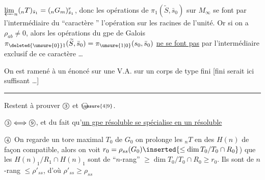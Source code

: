 $\varprojlim_n({}_nT)_{\bar s_1}=({}_nG_m)^r_{\bar s_1}$, donc les opérations de $\pi_1(\widetilde S,\bar s_0)$ sur $M_\infty$ se font par l'intermédiaire du ``caractère '' l'opération sur les racines de l'unité. Or si on a $\rho_{ab}\neq 0$, alors les opérations du gpe de Galois $\pi_{\deleted{\unsure{0}}1}(\widetilde S,\bar s_0)=\pi_{\unsure{1|0}}(s_0,\bar s_0)$ \uline{ne se font pas} par l'intermédiaire exclusif de ce caractère \ldots

On est ramené à un énoncé sur une V.A. sur un corps  de type fini [fini serait ici suffisant \ldots]

\begin{center}\rule{2.5cm}{0.35pt}\end{center}

Restent à prouver $\text{\textcircled{\scriptsize 3}}$ et $\text{\textcircled{\scriptsize\unsure{4|9}}}$.

$\text{\textcircled{\scriptsize 3}}\Longleftrightarrow\text{\textcircled{\scriptsize 9}}$, et   du fait qu'\uline{un gpe résoluble se spécialise en un résoluble}

$\text{\textcircled{\scriptsize 4}}$ On regarde un tore maximal $T_0$ de $G_0$
on prolonge les $ {}_nT$ en des $H(n)$ de façon compatible, alors on voit  $r_0=\rho_{ss}(G_0)\inserted{\leq\dim T_0/T_0\cap R_0}$) que les $H(n)_1/R_1\cap H(n)_1$ sont de ``$n$-rang'' $\geq\dim T_0/T_0\cap R_0\geq r_0$. Ils sont de $n$-rang $\leq\rho'_{ss}$, d'où $\rho'_{ss}\geq\rho_{ss}$ \unsure{\textendash|\ldots}
